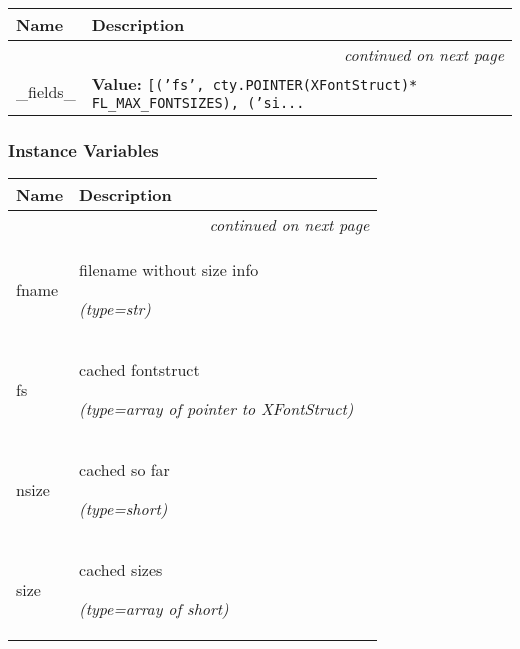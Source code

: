     \vspace{-1cm}
\hspace{\varindent}\begin{longtable}{|p{\varnamewidth}|p{\vardescrwidth}|l}
\cline{1-2}
\cline{1-2} \centering \textbf{Name} & \centering \textbf{Description}& \\
\cline{1-2}
\endhead\cline{1-2}\multicolumn{3}{r}{\small\textit{continued on next page}}\\\endfoot\cline{1-2}
\endlastfoot\raggedright \_\-f\-i\-e\-l\-d\-s\-\_\- & \raggedright \textbf{Value:} 
{\tt [('fs', cty.POINTER(XFontStruct)* FL\_MAX\_FONTSIZES), ('si\texttt{...}}&\\
\cline{1-2}
\end{longtable}



  \subsubsection{Instance Variables}

    \vspace{-1cm}
\hspace{\varindent}\begin{longtable}{|p{\varnamewidth}|p{\vardescrwidth}|l}
\cline{1-2}
\cline{1-2} \centering \textbf{Name} & \centering \textbf{Description}& \\
\cline{1-2}
\endhead\cline{1-2}\multicolumn{3}{r}{\small\textit{continued on next page}}\\\endfoot\cline{1-2}
\endlastfoot\raggedright f\-n\-a\-m\-e\- & \raggedright filename without size info

            {\it (type=str)}&\\
\cline{1-2}
\raggedright f\-s\- & \raggedright cached fontstruct

            {\it (type=array of pointer to XFontStruct)}&\\
\cline{1-2}
\raggedright n\-s\-i\-z\-e\- & \raggedright cached so far

            {\it (type=short)}&\\
\cline{1-2}
\raggedright s\-i\-z\-e\- & \raggedright cached sizes

            {\it (type=array of short)}&\\
\cline{1-2}
\end{longtable}

